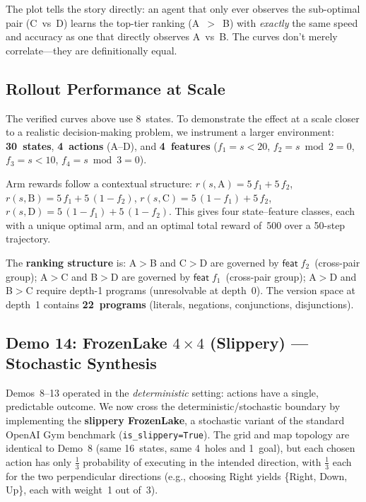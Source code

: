 \noindent The plot tells the story directly: an agent that only ever observes the sub-optimal pair (C~vs~D) learns the top-tier ranking (A~$>$~B) with \emph{exactly} the same speed and accuracy as one that directly observes A~vs~B.  The curves don't merely correlate---they are definitionally equal.

\subsection{Rollout Performance at Scale}
\label{sec:rollout}

The verified curves above use 8~states.
To demonstrate the effect at a scale closer to a realistic decision-making problem, we instrument a larger environment:
\textbf{30~states}, \textbf{4~actions} (A--D), and \textbf{4~features} ($f_1{=}s{<}20$, $f_2{=}s\bmod2{=}0$, $f_3{=}s{<}10$, $f_4{=}s\bmod3{=}0$).

Arm rewards follow a contextual structure:
$r(s,\text{A}){=}5\,f_1{+}5\,f_2$, $r(s,\text{B}){=}5\,f_1{+}5\,(1{-}f_2)$,
$r(s,\text{C}){=}5\,(1{-}f_1){+}5\,f_2$, $r(s,\text{D}){=}5\,(1{-}f_1){+}5\,(1{-}f_2)$.
This gives four state--feature classes, each with a unique optimal arm, and an optimal total reward of~500 over a 50-step trajectory.

The \textbf{ranking structure} is:
A${>}$B and C${>}$D are governed by $\mathsf{feat}\;f_2$~(cross-pair group);
A${>}$C and B${>}$D are governed by $\mathsf{feat}\;f_1$~(cross-pair group);
A${>}$D and B${>}$C require depth-1 programs (unresolvable at depth~0).
The version space at depth~1 contains \textbf{22~programs} (literals, negations, conjunctions, disjunctions).

\subsection{Demo 14: FrozenLake \texorpdfstring{$4 \times 4$}{4x4} (Slippery) --- Stochastic Synthesis}
\label{sec:e2e-frozenlake-slippery}

Demos~8--13 operated in the \emph{deterministic} setting: actions have a single, predictable outcome.
We now cross the deterministic/stochastic boundary by implementing the \textbf{slippery FrozenLake}, a stochastic variant of the standard OpenAI Gym benchmark (\texttt{is\_slippery=True}).
The grid and map topology are identical to Demo~8 (same 16~states, same 4~holes and 1~goal), but each chosen action has only $\tfrac{1}{3}$ probability of executing in the intended direction, with $\tfrac{1}{3}$ each for the two perpendicular directions (e.g., choosing Right yields \{Right, Down, Up\}, each with weight~1 out of~3).

